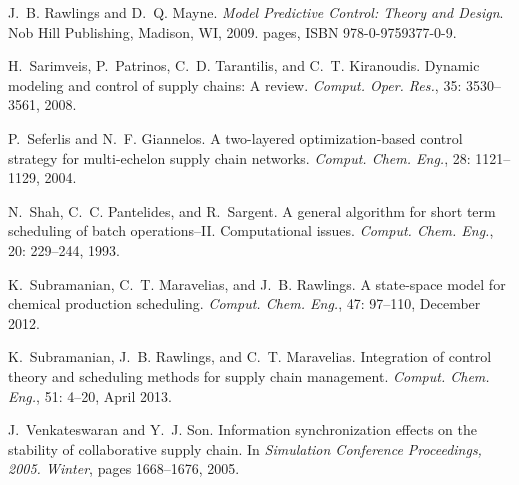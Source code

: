 \documentclass{elsarticle}
\theoremstyle{definition}
\begin{document}
\begin{thebibliography}{28}
J.~B. Rawlings and D.~Q. Mayne.
\newblock \emph{Model Predictive Control: Theory and Design}.
\newblock Nob Hill Publishing, Madison, WI, 2009.
 pages, ISBN 978-0-9759377-0-9.

H.~Sarimveis, P.~Patrinos, C.~D. Tarantilis, and C.~T. Kiranoudis.
\newblock Dynamic modeling and control of supply chains: {A} review.
\newblock \emph{Comput. Oper. Res.}, 35: 3530--3561, 2008.

P.~Seferlis and N.~F. Giannelos.
\newblock A two-layered optimization-based control strategy for multi-echelon
  supply chain networks.
\newblock \emph{Comput. Chem. Eng.}, 28: 1121--1129, 2004.

N.~Shah, C.~C. Pantelides, and R.~Sargent.
\newblock A general algorithm for short term scheduling of batch
  operations--{II}. {C}omputational issues.
\newblock \emph{Comput. Chem. Eng.}, 20: 229--244, 1993.

K.~Subramanian, C.~T. Maravelias, and J.~B. Rawlings.
\newblock A state-space model for chemical production scheduling.
\newblock \emph{Comput. Chem. Eng.}, 47: 97--110, December 2012.

K.~Subramanian, J.~B. Rawlings, and C.~T. Maravelias.
\newblock Integration of control theory and scheduling methods for supply chain
  management.
\newblock \emph{Comput. Chem. Eng.}, 51: 4--20, April 2013.

J.~Venkateswaran and Y.~J. Son.
\newblock Information synchronization effects on the stability of collaborative
  supply chain.
\newblock In \emph{Simulation Conference Proceedings, 2005. Winter}, pages
  1668--1676, 2005.

\end{thebibliography}
\end{document}
